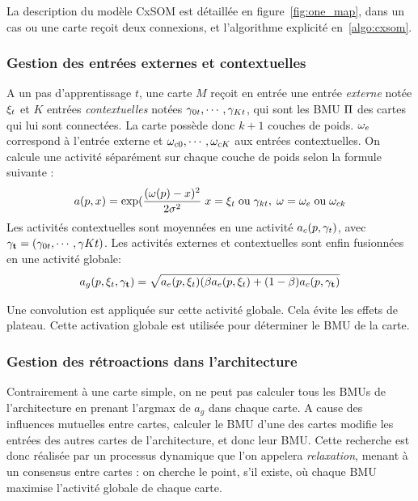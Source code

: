 La description du modèle CxSOM est détaillée en figure~\ref{fig:one_map}, dans un cas ou une carte reçoit deux connexions, et l'algorithme explicité en~\ref{algo:cxsom}.


\subsubsection{Gestion des entrées externes et contextuelles}

A un pas d'apprentissage $t$, une carte $M$ reçoit en entrée une entrée \emph{externe} notée $\xi_t$ et $K$ entrées \emph{contextuelles} notées $\gamma_{0t},\cdots,\gamma_{Kt}$, qui sont les BMU $\Pi$ des cartes qui lui sont connectées. La carte possède donc $k+1$ couches de poids. $\omega_e$ correspond à l'entrée externe et $\omega_{c0}, \cdots, \omega_{cK}$ aux entrées contextuelles. On calcule une activité séparément sur chaque couche de poids selon la formule suivante : 
\begin{equation}
\label{eq:activite}
a(p,x) = \exp(\frac{(\omega(p)-x)^2}{2\sigma^2} \; x = \xi_t\; \text{ou}\; \gamma_{kt}, \; \omega = \omega_e \;\text{ou}\; \omega_{ck}
\end{equation}
Les activités contextuelles sont moyennées en une activité $a_c(p,\mathbf{\gamma}_t)$, avec $\mathbf{\gamma_t} = (\gamma_{0t}, \cdots, \gamma{Kt})$. 
Les activités externes et contextuelles sont enfin fusionnées en une activité globale:
\begin{equation}
\label{eq:global_act}
a_g(p,\xi_t,\mathbf{\gamma_t}) = \sqrt{a_e(p,\xi_t)(\beta a_e(p,\xi_t) + (1-\beta) a_c(p, \mathbf{\gamma_t})}
\end{equation}

Une convolution est appliquée sur cette activité globale. Cela évite les effets de plateau.
Cette activation globale est utilisée pour déterminer le BMU de la carte. 

\subsubsection{Gestion des rétroactions dans l'architecture}

Contrairement à une carte simple, on ne peut pas calculer tous les BMUs de l'architecture en prenant l'argmax de $a_g$ dans chaque carte. A cause des influences mutuelles entre cartes, calculer le BMU d'une des cartes modifie les entrées des autres cartes de l'architecture, et donc leur BMU. Cette recherche est donc réalisée par un processus dynamique que l'on appelera \emph{relaxation}, menant à un consensus entre cartes : on cherche le point, s'il existe, où chaque BMU maximise l'activité globale de chaque carte.

